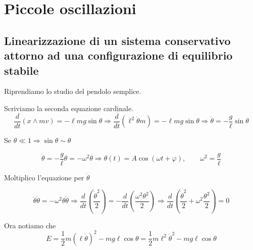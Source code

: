 \chapter{Piccole oscillazioni}
\section{Linearizzazione di un sistema conservativo attorno ad una configurazione di equilibrio stabile}
\begin{example}{}
Riprendiamo lo studio del pendolo semplice.

\begin{center}
\end{center}

Scriviamo la seconda equazione cardinale.
\[
\frac{d}{dt}(x\wedge mv)=-\ell mg\sin\theta
\Rightarrow
\frac{d}{dt}(\ell^2\dot{\theta}m)=-\ell mg\sin\theta
\Rightarrow
\ddot{\theta}=-\frac{g}{\ell}\sin\theta
\]

Se \(\theta\ll 1\Rightarrow \sin\theta\sim\theta\)

\[
\ddot{\theta}=-\frac{g}{\ell}\theta=-\omega^2\theta
\Rightarrow
\theta(t)=A\cos(\omega t+\varphi),
\qquad
\omega^2=\frac{g}{\ell}
\]

Moltiplico l'equazione per \(\dot{\theta}\)

\[
\ddot{\theta}\dot{\theta}=-\omega^2\theta\dot{\theta}
\Rightarrow
\frac{d}{dt}\left(\frac{\dot{\theta}^2}{2}\right)
=
-\frac{d}{dt}\left(\frac{\omega^2\theta^2}{2}\right)
\Rightarrow
\frac{d}{dt}\left(\frac{\dot{\theta}^2}{2}+\omega^2\frac{\theta^2}{2}\right)=0
\]

Ora notiamo che
\[
E=\frac{1}{2}m(\ell\dot{\theta})^2-mg\ell\cos\theta
=
\frac{1}{2}m\ell^2\dot{\theta}^2-mg\ell\cos\theta
\]


\end{example}
